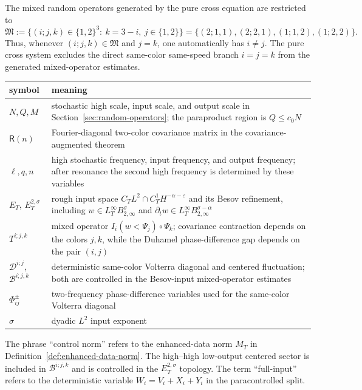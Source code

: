 \documentclass[10pt]{amsart}
\numberwithin{equation}{section}
\theoremstyle{plain}
\theoremstyle{definition}
\theoremstyle{remark}
\newcommand{\Btwo}{B_{2,\infty}}
\newcommand{\eps}{\varepsilon}
\begin{document}
The mixed random operators generated by the pure cross equation are restricted to
\begin{equation}\label{eq:mixed-index-set}
        \mathfrak M
        :=\bigl\{(i;j,k)\in\{1,2\}^3:\ k=3-i,\ j\in\{1,2\}\bigr\}
        =\bigl\{(2;1,1),(2;2,1),(1;1,2),(1;2,2)\bigr\}.
\end{equation}
Thus, whenever \((i;j,k)\in\mathfrak M\) and \(j=k\), one automatically has \(i\ne j\).  The pure cross system excludes the direct same-color same-speed branch \(i=j=k\) from the generated mixed-operator estimates.
\begin{center}
\small
\begin{tabular}{@{}p{}p{}@{}}
\toprule
symbol & meaning \\
\midrule
$N,Q,M$ & stochastic high scale, input scale, and output scale in Section~\ref{sec:random-operators}; the paraproduct region is $Q\le c_0N$ \\
$\mathsf R(n)$ & Fourier-diagonal two-color covariance matrix in the covariance-augmented theorem \\
$\ell,q,n$ & high stochastic frequency, input frequency, and output frequency; after resonance the second high frequency is determined by these variables \\
$E_T$, $E_T^{2,\sigma}$ & rough input space $C_TL^2\cap C_T^1H^{-\alpha-\eps}$ and its Besov refinement, including $w\in L_T^\infty\Btwo^\sigma$ and $\partial_tw\in L_T^\infty\Btwo^{\sigma-\alpha}$ \\
$T^{i;j,k}$ & mixed operator $I_i(w<\Psi_j)\circ\Psi_k$; covariance contraction depends on the colors $j,k$, while the Duhamel phase-difference gap depends on the pair $(i,j)$ \\
$\mathcal D^{i;j}$, $\mathcal B^{i;j,k}$ & deterministic same-color Volterra diagonal and centered fluctuation; both are controlled in the Besov-input mixed-operator estimates \\
$\Phi_{ij}^{\pm}$ & two-frequency phase-difference variables used for the same-color Volterra diagonal \\
$\sigma$ & dyadic $L^2$ input exponent \\
\bottomrule
\end{tabular}
\end{center}
The phrase ``control norm'' refers to the enhanced-data norm $M_T$ in Definition~\ref{def:enhanced-data-norm}.  The high--high low-output centered sector is included in $\mathcal B^{i;j,k}$ and is controlled in the $E_T^{2,\sigma}$ topology.  The term ``full-input'' refers to the deterministic variable $W_i=V_i+X_i+Y_i$ in the paracontrolled split.
\end{document}
